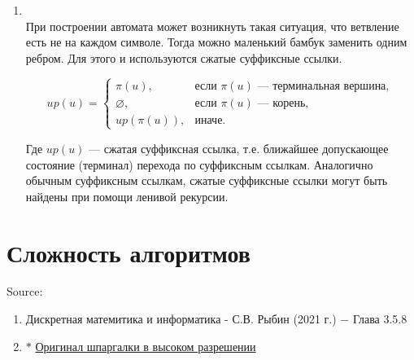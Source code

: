 \begin{enumerate}[label=\textbf{\arabic* Шаг}:]
        
            \item {}\\
            
            При построении автомата может возникнуть такая ситуация, что ветвление есть не на каждом символе. Тогда можно маленький бамбук заменить одним ребром. Для этого и используются сжатые суффиксные ссылки.
            
            \[
            up(u)=
            \begin{cases}
            \pi(u), & \text{если } \pi(u) \text{ --- терминальная вершина}, \\
            \varnothing, & \text{если } \pi(u) \text{ --- корень}, \\
            up(\pi(u)), & \text{иначе}.
            \end{cases}
            \]
            
            Где $up(u)$ --- сжатая суффиксная ссылка, т.е. ближайшее допускающее состояние (терминал) перехода по суффиксным ссылкам. Аналогично обычным суффиксным ссылкам, сжатые суффиксные ссылки могут быть найдены при помощи ленивой рекурсии.


        \end{enumerate}

\newpage
\section{Сложность алгоритмов}
    Source:
    \begin{enumerate}
        \item Дискретная матемитика и информатика - С.В. Рыбин (2021 г.) $-$ Глава 3.5.8
        \item $\ast$ \href{https://vk.cc/aw2KxE}{Оригинал шпаргалки в высоком разрешении}
    \end{enumerate}
    
